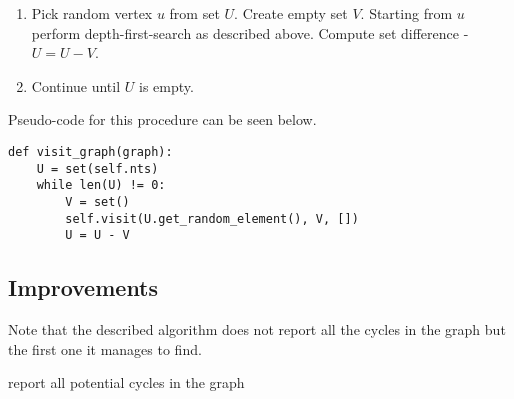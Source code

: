 \begin{enumerate}
\item
Pick random vertex $u$ from set $U$. Create empty set $V$. Starting from $u$ perform depth-first-search as described above. Compute set difference - $U = U-V$.
\item
Continue until $U$ is empty.
\end{enumerate}

Pseudo-code for this procedure can be seen below.

\begin{lstlisting}
def visit_graph(graph):
	U = set(self.nts)
	while len(U) != 0:
		V = set()
		self.visit(U.get_random_element(), V, [])
		U = U - V
\end{lstlisting}

\subsection{Improvements}
Note that the described algorithm does not report all the cycles in the graph but the first one it manages to find.

report all potential cycles in the graph
